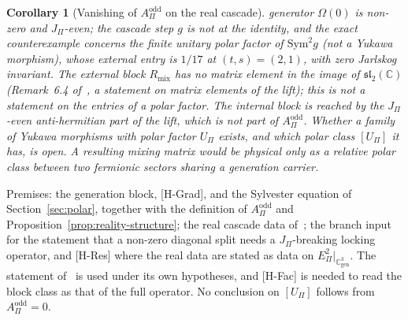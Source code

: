 \documentclass[11pt]{article}
\newtheorem{corollary}{Corollary}
\theoremstyle{definition}
\theoremstyle{remark}
\newcommand{\JPi}{J_{\Pi}}
\newcommand{\Cgen}{\mathbb{C}^{3}_{\mathrm{gen}}}
\newcommand{\Epi}{E_{\Pi}}
\newcommand{\Upi}{U_{\Pi}}
\newcommand{\Opol}{\Omega}
\newcommand{\Aodd}{A_{\Pi}^{\mathrm{odd}}}
\newcommand{\Sym}{\mathrm{Sym}}
\begin{document}
\begin{corollary}[Vanishing of $\Aodd$ on the real cascade]
      generator $\Opol(0)$ is non-zero and $\JPi$-even; the cascade step $g$ is not at the identity, and the exact
      counterexample concerns the finite unitary polar factor of $\Sym^{2}g$ (not a Yukawa morphism), whose external
      entry is $1/17$ at $(t, s) = (2, 1)$, with zero Jarlskog invariant.
      The external block $R_{\mathrm{mix}}$ has no matrix element in the image of $\mathfrak{sl}_{2}(\mathbb{C})$
      (Remark~6.4 of~\cite{Beau2026q14}, a statement on matrix elements of the lift); this is not a statement on the
      entries of a polar factor.
      The internal block is reached by the $\JPi$-even anti-hermitian part of the lift, which is not part of
      $\Aodd$.
      Whether a family of Yukawa morphisms with polar factor $\Upi$ exists, and which polar class $[\Upi]$ it has, is
      open.
      A resulting mixing matrix would be physical only as a relative polar class between two fermionic sectors
      sharing a generation carrier.
    \end{corollary}

    Premises: the generation block, [H-Grad], and the Sylvester equation of Section~\ref{sec:polar}, together with the
    definition of $\Aodd$ and Proposition~\ref{prop:reality-structure}; the real cascade data
    of~\cite{Beau2026prs}; the branch input for the statement that a non-zero diagonal split needs a
    $\JPi$-breaking locking operator, and [H-Res] where the real data are stated as data on $\Epi^{2}|_{\Cgen}$.
    The statement of~\cite{Beau2026ebj} is used under its own hypotheses, and [H-Fac] is needed to read the block class
    as that of the full operator.
    No conclusion on $[\Upi]$ follows from $\Aodd = 0$.
\end{document}
